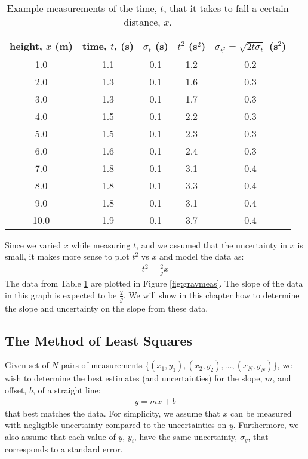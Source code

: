 \begin{table}[h!]
\center
\begin{tabular}{|c|c|c|c|c|}
\hline
\textbf{height, $x$ (m)}&\textbf{time, $t$, (s)}&\textbf{$\sigma_t$ (s)}&\textbf{$t^2$ (s$^2$)}&\textbf{$\sigma_{t^2}=\sqrt{2t\sigma_t}$ (s$^2$)}\\
\hline
1.0 & 1.1 & 0.1 & 1.2 & 0.2 \\ 
\hline
2.0 & 1.3 & 0.1 & 1.6 & 0.3 \\ 
\hline
3.0 & 1.3 & 0.1 & 1.7 & 0.3 \\ 
\hline
4.0 & 1.5 & 0.1 & 2.2 & 0.3 \\ 
\hline
5.0 & 1.5 & 0.1 & 2.3 & 0.3 \\ 
\hline
6.0 & 1.6 & 0.1 & 2.4 & 0.3 \\ 
\hline
7.0 & 1.8 & 0.1 & 3.1 & 0.4 \\ 
\hline
8.0 & 1.8 & 0.1 & 3.3 & 0.4 \\ 
\hline
9.0 & 1.8 & 0.1 & 3.1 & 0.4 \\ 
\hline
10.0 & 1.9 & 0.1 & 3.7 & 0.4 \\ 
\hline
\end{tabular}
\caption{\label{tab:gravmeas} Example measurements of the time, $t$, that it takes to fall a certain distance, $x$.}
\end{table}

Since we varied $x$ while measuring $t$, and we assumed that the uncertainty in $x$ is small, it makes more sense to plot $t^2$ vs $x$ and model the data as:
\begin{align}
\label{eqn:t2ofx}
t^2 = \frac{2}{g}x
\end{align}
The data from Table \ref{tab:gravmeas} are plotted in Figure \ref{fig:gravmeas}. The slope of the data in this graph is expected to be $\frac{2}{g}$. We will show in this chapter how to determine the slope and uncertainty on the slope from these data. 


\subsection{The Method of Least Squares}
Given set of $N$ pairs of measurements \{$(x_1,y_1), (x_2,y_2), \dots, (x_N,y_N)$\}, we wish to determine the best estimates (and uncertainties) for the slope, $m$, and offset, $b$, of a straight line:
\begin{align}
\label{eqn:mbmodel}
y=mx+b
\end{align}
that best matches the data. For simplicity, we assume that $x$ can be measured with negligible uncertainty compared to the uncertainties on $y$. Furthermore, we also assume that each value of $y$, $y_i$, have the same uncertainty, $\sigma_{y}$, that corresponds to a standard error.

